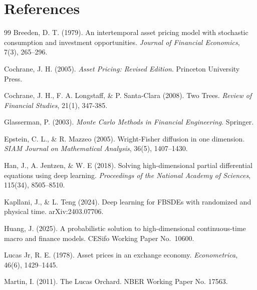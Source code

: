 \documentclass[11pt,letterpaper,oneside]{article}
\numberwithin{equation}{section}
\newcommand{\1}{\mathbf{1}}
\begin{document}
\section*{References}
\begin{thebibliography}{99}\small
{} Breeden, D. T. (1979).
An intertemporal asset pricing model with stochastic consumption and investment opportunities.
\emph{Journal of Financial Economics}, 7(3), 265--296.

 Cochrane, J. H. (2005).
\emph{Asset Pricing: Revised Edition}.
Princeton University Press.

 Cochrane, J. H., F. A. Longstaff, \& P. Santa-Clara (2008). Two Trees.
\emph{Review of Financial Studies}, 21(1), 347-385.

 Glasserman, P. (2003).
\emph{Monte Carlo Methods in Financial Engineering}. Springer.

 Epstein, C. L., \& R. Mazzeo (2005). Wright-Fisher diffusion in one dimension. \emph{SIAM Journal on Mathematical Analysis}, 36(5), 1407--1430.

 Han, J., A. Jentzen, \& W. E (2018). Solving high-dimensional partial differential equations using deep learning. \emph{Proceedings of the National Academy of Sciences}, 115(34), 8505--8510.

 Kapllani, J., \& L. Teng (2024).
Deep learning for FBSDEs with randomized and physical time.
arXiv:2403.07706.

 Huang, J. (2025).
A probabilistic solution to high-dimensional continuous-time macro and finance models.
CESifo Working Paper No.~10600.

 Lucas Jr, R. E. (1978).
Asset prices in an exchange economy.
\emph{Econometrica}, 46(6), 1429--1445.

 Martin, I. (2011).
The Lucas Orchard. NBER Working Paper No. 17563.


\end{thebibliography}
\end{document}
